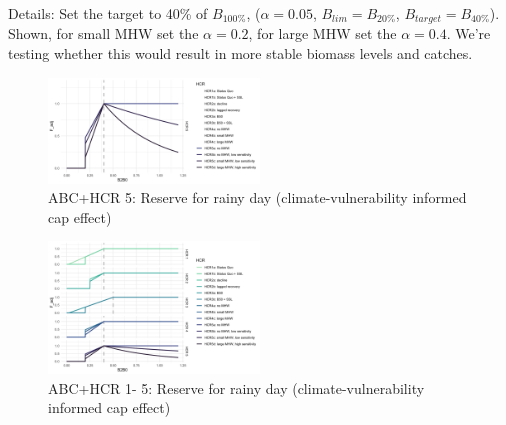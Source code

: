 \documentclass[
]{article}
\begin{document}
Details: Set the target to 40\% of \(B_{100\%}\), (\(\alpha = 0.05\),
\(B_{lim} = B_{20\%}\), \(B_{target} = B_{40\%}\)). Shown, for small MHW
set the \(\alpha = 0.2\), for large MHW set the \(\alpha = 0.4\). We're
testing whether this would result in more stable biomass levels and
catches.

\begin{figure}
\centering
\includegraphics[width=0.5\textwidth,height=\textheight]{../../Figs/HCR_figs/HCR5.png}
\caption{ABC+HCR 5: Reserve for rainy day (climate-vulnerability
informed cap effect)}
\end{figure}

\begin{figure}
\centering
\includegraphics[width=0.5\textwidth,height=\textheight]{../../Figs/HCR_figs/HCR1TO5.png}
\caption{ABC+HCR 1- 5: Reserve for rainy day (climate-vulnerability
informed cap effect)}
\end{figure}
\end{document}
